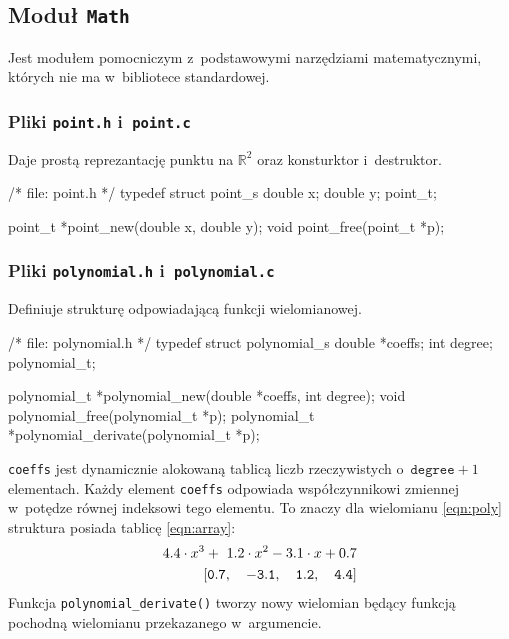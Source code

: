 \documentclass[10pt,a4paper]{article}
\newcommand{\p}[1]{\texttt{#1}}
\begin{document}
\subsection{Moduł \p{Math}}
\label{sec:modul_math}

Jest modułem pomocniczym z~podstawowymi narzędziami matematycznymi, których nie
ma w~bibliotece standardowej.

\subsubsection{Pliki \p{point.h} i~\p{point.c}}
Daje prostą reprezantację punktu na $\mathbb{R}^{2}$ oraz konsturktor i~destruktor.
\begin{SmallVerbatim}
    /* file: point.h */
    typedef struct point_s {
      double x;
      double y;
    } point_t;
    
    point_t *point_new(double x, double y);
    void point_free(point_t *p);
\end{SmallVerbatim}

\subsubsection{Pliki \p{polynomial.h} i~\p{polynomial.c}}
Definiuje strukturę odpowiadającą funkcji wielomianowej.
\begin{SmallVerbatim}
    /* file: polynomial.h */
    typedef struct polynomial_s {
      double *coeffs;
      int degree;
    } polynomial_t;
    
    polynomial_t *polynomial_new(double *coeffs, int degree);
    void polynomial_free(polynomial_t *p);
    polynomial_t *polynomial_derivate(polynomial_t *p);
\end{SmallVerbatim}
\p{coeffs} jest dynamicznie alokowaną tablicą liczb rzeczywistych
o~$\p{degree}+1$ elementach. Każdy element \p{coeffs} odpowiada współczynnikowi
zmiennej w~potędze równej indeksowi tego elementu. To znaczy dla wielomianu
\ref{eqn:poly} struktura posiada tablicę \ref{eqn:array}:
\begin{eqnarray}
  4.4 \cdot x^{3} +~1.2 \cdot x^2 - 3.1 \cdot x + 0.7 \label{eqn:poly}\\
  {\tt\left[ 0.7,\quad -3.1,\quad 1.2, \quad 4.4 \right]} \label{eqn:array}
\end{eqnarray}
Funkcja \p{polynomial\_derivate()} tworzy nowy wielomian będący funkcją
pochodną wielomianu przekazanego w~argumencie.
\end{document}
